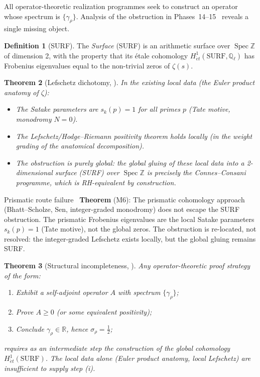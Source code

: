 \documentclass[11pt]{amsart}
\newtheorem{theorem}{Theorem}[section]
\theoremstyle{definition}
\newtheorem{definition}[theorem]{Definition}
\theoremstyle{remark}
\newcommand{\half}{\tfrac{1}{2}}
\newcommand{\sig}{\sigma}
\newcommand{\gam}{\gamma}
\newcommand{\Spec}{\operatorname{Spec}}
\begin{document}
All operator-theoretic realization programmes seek to construct an operator whose
spectrum is $\{\gam_\rho\}$.  Analysis of the obstruction in Phases~14--15~\cite{RP21}
reveals a single missing object.

\begin{definition}[SURF]
The \emph{Surface} (SURF) is an arithmetic surface over $\Spec\mathbb{Z}$ of dimension 2,
with the property that its étale cohomology $H^1_{\acute{e}t}(\text{SURF}, \mathbb{Q}_\ell)$
has Frobenius eigenvalues equal to the non-trivial zeros of $\zeta(s)$.
\end{definition}

\begin{theorem}[Lefschetz dichotomy, \cite{RP21}]
\label{thm:lefschetz}
In the existing local data (the Euler product anatomy of $\zeta$):
\begin{itemize}
  \item The Satake parameters are $s_k(p) = 1$ for all primes $p$ (Tate motive,
    monodromy $N=0$).
  \item The Lefschetz/Hodge--Riemann positivity theorem holds \emph{locally}
    (in the weight grading of the anatomical decomposition).
  \item The obstruction is \emph{purely global}: the global gluing of these local
    data into a 2-dimensional surface (SURF) over $\Spec\mathbb{Z}$ is precisely
    the Connes--Consani programme, which is RH-equivalent by construction.
\end{itemize}
\end{theorem}

\begin{nogobox}{Prismatic route failure~\cite{RP21}}
\textbf{Theorem} (M6): The prismatic cohomology approach (Bhatt--Scholze, Sen,
integer-graded monodromy) does not escape the SURF obstruction.  The prismatic
Frobenius eigenvalues are the local Satake parameters $s_k(p)=1$ (Tate motive),
not the global zeros.  The obstruction is re-located, not resolved: the integer-graded
Lefschetz exists locally, but the global gluing remains SURF.
\end{nogobox}

\begin{theorem}[Structural incompleteness, \cite{RP21}]
Any operator-theoretic proof strategy of the form:
\begin{enumerate}[label=\upshape(\roman*)]
  \item Exhibit a self-adjoint operator $A$ with spectrum $\{\gam_\rho\}$;
  \item Prove $A\ge 0$ (or some equivalent positivity);
  \item Conclude $\gam_\rho\in\mathbb{R}$, hence $\sig_\rho=\half$;
\end{enumerate}
requires as an intermediate step the construction of the global cohomology
$H^1_{\acute{e}t}(\text{SURF})$.  The local data alone (Euler product anatomy,
local Lefschetz) are insufficient to supply step (i).
\end{theorem}
\end{document}
